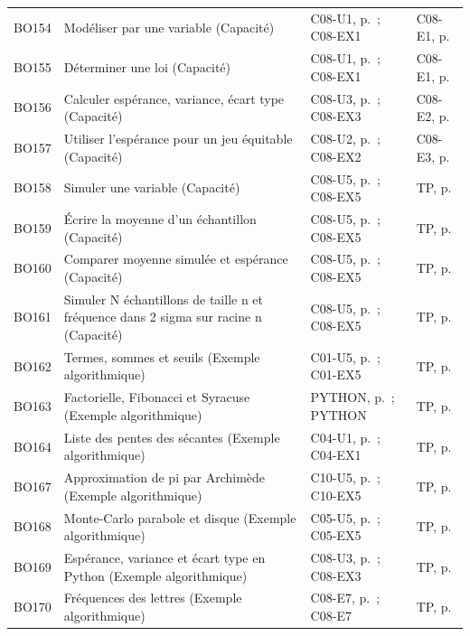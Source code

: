 \begin{longtable}{p{.1\linewidth}p{.43\linewidth}p{.19\linewidth}p{.16\linewidth}}
BO154 & Modéliser par une variable (Capacité) & C08-U1, p.\,\pageref{C08-U1} ; C08-EX1 & C08-E1, p.\,\pageref{C08-E1} \\
BO155 & Déterminer une loi (Capacité) & C08-U1, p.\,\pageref{C08-U1} ; C08-EX1 & C08-E1, p.\,\pageref{C08-E1} \\
BO156 & Calculer espérance, variance, écart type (Capacité) & C08-U3, p.\,\pageref{C08-U3} ; C08-EX3 & C08-E2, p.\,\pageref{C08-E2} \\
BO157 & Utiliser l’espérance pour un jeu équitable (Capacité) & C08-U2, p.\,\pageref{C08-U2} ; C08-EX2 & C08-E3, p.\,\pageref{C08-E3} \\
BO158 & Simuler une variable (Capacité) & C08-U5, p.\,\pageref{C08-U5} ; C08-EX5 & TP, p.\,\pageref{TP} \\
BO159 & Écrire la moyenne d’un échantillon (Capacité) & C08-U5, p.\,\pageref{C08-U5} ; C08-EX5 & TP, p.\,\pageref{TP} \\
BO160 & Comparer moyenne simulée et espérance (Capacité) & C08-U5, p.\,\pageref{C08-U5} ; C08-EX5 & TP, p.\,\pageref{TP} \\
BO161 & Simuler N échantillons de taille n et fréquence dans 2 sigma sur racine n (Capacité) & C08-U5, p.\,\pageref{C08-U5} ; C08-EX5 & TP, p.\,\pageref{TP} \\
BO162 & Termes, sommes et seuils (Exemple algorithmique) & C01-U5, p.\,\pageref{C01-U5} ; C01-EX5 & TP, p.\,\pageref{TP} \\
BO163 & Factorielle, Fibonacci et Syracuse (Exemple algorithmique) & PYTHON, p.\,\pageref{PYTHON} ; PYTHON & TP, p.\,\pageref{TP} \\
BO164 & Liste des pentes des sécantes (Exemple algorithmique) & C04-U1, p.\,\pageref{C04-U1} ; C04-EX1 & TP, p.\,\pageref{TP} \\
BO167 & Approximation de pi par Archimède (Exemple algorithmique) & C10-U5, p.\,\pageref{C10-U5} ; C10-EX5 & TP, p.\,\pageref{TP} \\
BO168 & Monte-Carlo parabole et disque (Exemple algorithmique) & C05-U5, p.\,\pageref{C05-U5} ; C05-EX5 & TP, p.\,\pageref{TP} \\
BO169 & Espérance, variance et écart type en Python (Exemple algorithmique) & C08-U3, p.\,\pageref{C08-U3} ; C08-EX3 & TP, p.\,\pageref{TP} \\
BO170 & Fréquences des lettres (Exemple algorithmique) & C08-E7, p.\,\pageref{C08-E7} ; C08-E7 & TP, p.\,\pageref{TP} \\
\bottomrule\end{longtable}\normalsize
